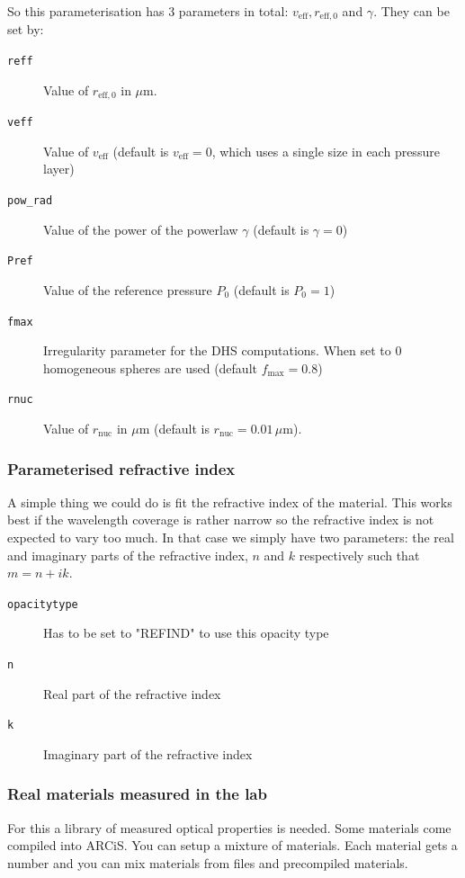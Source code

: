 \documentclass[12pt]{article}
\begin{document}
So this parameterisation has 3 parameters in total: $v_\mathrm{eff}, r_\mathrm{eff,0}$ and $\gamma$. They can be set by:
\begin{description}
\item[\texttt{reff}]
Value of $r_\mathrm{eff,0}$ in $\mu$m.
\item[\texttt{veff}]
Value of $v_\mathrm{eff}$ (default is $v_\mathrm{eff}=0$, which uses a single size in each pressure layer)
\item[\texttt{pow\_rad}]
Value of the power of the powerlaw $\gamma$ (default is $\gamma=0$)
\item[\texttt{Pref}]
Value of the reference pressure $P_0$ (default is $P_0=1$)
\item[\texttt{fmax}]
Irregularity parameter for the DHS computations. When set to 0 homogeneous spheres are used (default $f_\mathrm{max}=0.8$)
\item[\texttt{rnuc}]
Value of $r_\mathrm{nuc}$ in $\mu$m (default is $r_\mathrm{nuc}=0.01\,\mu$m).
\end{description}

\subsubsection*{Parameterised refractive index}

A simple thing we could do is fit the refractive index of the material. This works best if the wavelength coverage is rather narrow so the refractive index is not expected to vary too much. In that case we simply have two parameters: the real and imaginary parts of the refractive index, $n$ and $k$ respectively such that $m=n+ik$.

\begin{description}
\item[\texttt{opacitytype}]
Has to be set to "REFIND" to use this opacity type
\item[\texttt{n}]
Real part of the refractive index
\item[\texttt{k}]
Imaginary part of the refractive index
\end{description}

\subsubsection*{Real materials measured in the lab}

For this a library of measured optical properties is needed. Some materials come compiled into ARCiS. You can setup a mixture of materials. Each material gets a number and you can mix materials from files and precompiled materials.
\end{document}
